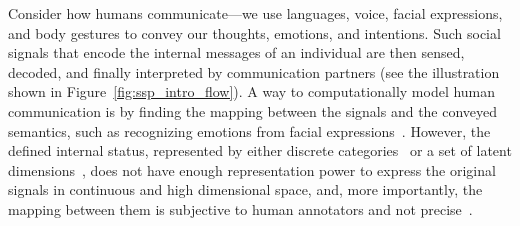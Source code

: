 

Consider how humans communicate---we use languages, voice, facial expressions, and body gestures to convey our thoughts, emotions, and intentions. Such social signals that encode the internal messages of an individual are then sensed, decoded, and finally interpreted by communication partners (see the illustration shown in Figure~\ref{fig:ssp_intro_flow}). A way to computationally model human communication is by finding the mapping between the signals and the conveyed semantics, such as recognizing emotions from facial expressions~\cite{zeng2009survey}. However, the defined internal status, represented by either discrete categories~\cite{ekman1969} or a set of latent dimensions~\cite{osgood1952nature, russell1979affective, plutchik2001nature}, does not have enough representation power to express the original signals in continuous and high dimensional space, and, more importantly, the mapping between them is subjective to human annotators and not precise~\cite{steidl2005all}. 

